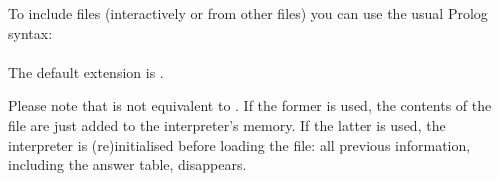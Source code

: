
To include files (interactively or from other files) you can use the usual
Prolog syntax:\\
\ind
{}\label{dir:include}\\
The default extension is .%
%

Please note that  is not equivalent to
. If the former is used, the contents of the file
are just added to the interpreter's memory. If the latter is used, the
interpreter is (re)initialised before loading the file: all previous
information, including the answer table, disappears.

%
